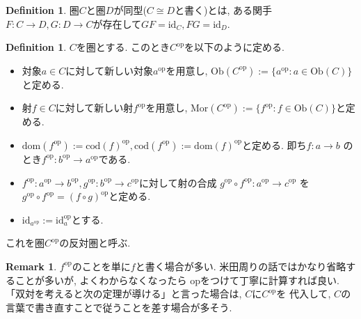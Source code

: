 \documentclass[a4paper,10pt]{article}
\theoremstyle{definition}
\newtheorem{definition}[thm]{\bfseries Definition}
\newtheorem{remark}[thm]{\bfseries Remark}    %
\begin{document}
\begin{definition}
    圏$C$と圏$D$が同型($C \cong D$と書く)とは, ある関手$F: C \rightarrow D,
    G: D \rightarrow C$が存在して$GF= \mathrm{\mathrm{id}}_C, FG=\mathrm{id}_D$.
\end{definition}
\begin{definition}
    $C$を圏とする. このとき$C^{\mathrm{op}}$を以下のように定める.
    \begin{itemize}
        \item 対象$a \in C$に対して新しい対象$a^{\mathrm{op}}$を用意し, $\mathrm{Ob}(C^{\mathrm{op}})
        := \{a^{\mathrm{op}}:a \in \mathrm{Ob}(C)\}$と定める. 
        \item 射$f \in C$に対して新しい射$f^{\mathrm{op}}$を用意し, $\mathrm{Mor}(C^{\mathrm{op}})
        := \{f^{\mathrm{op}}:f \in \mathrm{Ob}(C)\}$と定める. 
        \item $\mathrm{dom}(f^{\mathrm{op}}):=\mathrm{cod}(f)^{\mathrm{op}}, 
        \mathrm{cod}(f^{\mathrm{op}}):=\mathrm{dom}(f)^{\mathrm{op}}$と定める. 即ち$f:a \rightarrow b$
        のとき$f^{\mathrm{op}}: b^{\mathrm{op}} \rightarrow a^{\mathrm{op}}$である.
        \item $f^{\mathrm{op}}:a^{\mathrm{op}} \rightarrow b^{\mathrm{op}}, g^{\mathrm{op}}
        : b^{\mathrm{op}} \rightarrow c^{\mathrm{op}}$に対して射の合成
        $g^{\mathrm{op}}\circ f^{\mathrm{op}}: a^{\mathrm{op}} \rightarrow c^{\mathrm{op}}$
        を $g^{\mathrm{op}}\circ f^{\mathrm{op}}=(f \circ g)^{\mathrm{op}}$と定める.
        \item $\mathrm{id}_{a^{\mathrm{op}}}:= \mathrm{id}_a^{\mathrm{op}}$とする.
    \end{itemize}
    これを圏$C^{\mathrm{op}}$の反対圏と呼ぶ.
\end{definition}
\begin{remark}
    $f^{\mathrm{op}}$のことを単に$f$と書く場合が多い. 米田周りの話ではかなり省略することが多いが, よくわからなくなったら
    $\mathrm{op}$をつけて丁寧に計算すれば良い.「双対を考えると次の定理が導ける」と言った場合は, $C$に$C^{\mathrm{op}}$を
    代入して, $C$の言葉で書き直すことで従うことを差す場合が多そう.
\end{remark}
\end{document}
